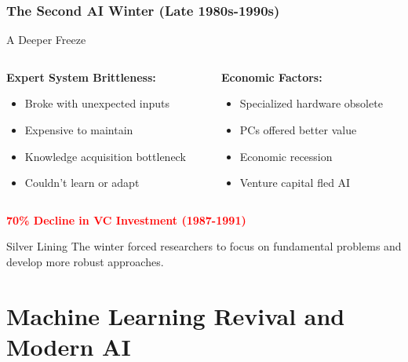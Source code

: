 \documentclass{beamer}
\begin{document}
\begin{frame}
    \frametitle{The Second AI Winter (Late 1980s-1990s)}
    \begin{alertblock}{A Deeper Freeze}
        \begin{columns}
            \begin{column}{0.48\textwidth}
                \textbf{Expert System Brittleness:}
                \begin{itemize}
                    \item Broke with unexpected inputs
                    \item Expensive to maintain
                    \item Knowledge acquisition bottleneck
                    \item Couldn't learn or adapt
                \end{itemize}
            \end{column}
            \begin{column}{0.48\textwidth}
                \textbf{Economic Factors:}
                \begin{itemize}
                    \item Specialized hardware obsolete
                    \item PCs offered better value
                    \item Economic recession
                    \item Venture capital fled AI
                \end{itemize}
            \end{column}
        \end{columns}
    \end{alertblock}
    
    \begin{center}
        \textcolor{red}{\textbf{\Large 70\% Decline in VC Investment (1987-1991)}}
    \end{center}
    
    \begin{exampleblock}{Silver Lining}
        The winter forced researchers to focus on fundamental problems and develop more robust approaches.
    \end{exampleblock}
\end{frame}

\section{Machine Learning Revival and Modern AI}
\end{document}

